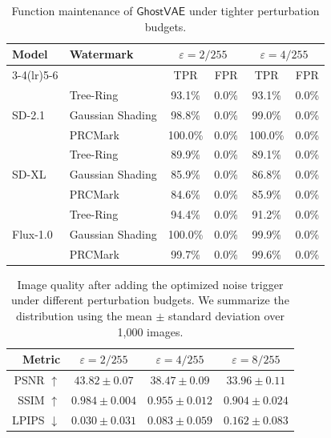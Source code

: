 \documentclass[letterpaper,twocolumn,10pt]{article}
\newcommand{\mg}{$\mathsf{GhostVAE}$\xspace}
\begin{document}
\begin{table}[t]
\centering
\caption{Function maintenance of \mg under tighter perturbation budgets.}
\label{tab:attack_results_tpr_fpr_ablation_eps}
\setlength{\tabcolsep}{3pt}
\begin{tabular}{ll cc cc}
\toprule
\multirow{2}{*}{Model} & \multirow{2}{*}{Watermark} &
\multicolumn{2}{c}{$\varepsilon=2/255$} &
\multicolumn{2}{c}{$\varepsilon=4/255$} \\
\cmidrule(lr){3-4}\cmidrule(lr){5-6}
& & TPR & FPR & TPR & FPR \\
\midrule
\multirow{3}{*}{SD-2.1}
& Tree-Ring & 93.1\% & 0.0\% & 93.1\% & 0.0\% \\
& Gaussian Shading      & 98.8\% & 0.0\% & 99.0\% & 0.0\% \\
& PRCMark     & 100.0\%  & 0.0\% & 100.0\%  & 0.0\% \\
\midrule
\multirow{3}{*}{SD-XL}
& Tree-Ring & 89.9\% & 0.0\% & 89.1\% & 0.0\% \\
& Gaussian Shading      & 85.9\% & 0.0\% & 86.8\% & 0.0\% \\
& PRCMark     & 84.6\% & 0.0\% & 85.9\% & 0.0\% \\
\midrule
\multirow{3}{*}{Flux-1.0}
& Tree-Ring & 94.4\% & 0.0\% & 91.2\% & 0.0\% \\
& Gaussian Shading      & 100.0\%  & 0.0\% & 99.9\% & 0.0\% \\
& PRCMark     & 99.7\% & 0.0\% & 99.6\% & 0.0\% \\
\bottomrule
\end{tabular}
\end{table}

\begin{table}[t]
\centering
\caption{Image quality after adding the optimized noise trigger under different perturbation budgets.
We summarize the distribution using the mean $\pm$ standard deviation over 1,000 images.}
\label{tab:trigger_quality_metrics}
\setlength{\tabcolsep}{3.2pt}
\renewcommand{\arraystretch}{1.05}
\begin{tabular}{rccc}
\toprule
\textbf{Metric} & $\varepsilon=2/255$ & $\varepsilon=4/255$ & $\varepsilon=8/255$ \\
\midrule
PSNR $\uparrow$   & $43.82 \pm 0.07$ & $38.47 \pm 0.09$ & $33.96 \pm 0.11$ \\
SSIM $\uparrow$   & $0.984 \pm 0.004$ & $0.955 \pm 0.012$ & $0.904 \pm 0.024$ \\
LPIPS $\downarrow$& $0.030 \pm 0.031$ & $0.083 \pm 0.059$ & $0.162 \pm 0.083$ \\
\bottomrule
\end{tabular}
\end{table}
\end{document}
